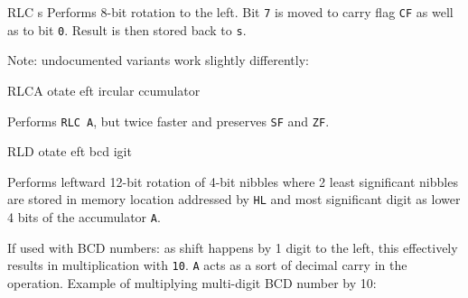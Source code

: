 \begin{basedescript}{
    \desclabelstyle{\multilinelabel}
    \desclabelwidth{3cm}}
\begin{DetailItem}{RLC s}
        Performs 8-bit rotation to the left. Bit {\tt 7} is moved to carry flag {\tt CF} as well as to bit {\tt 0}. Result is then stored back to {\tt s}.

        Note: undocumented variants work slightly differently:

        \begin{multicols}{2}

        \end{multicols}

        \begin{DetailEffects}[p]
            \FlagsRLCr
        \end{DetailEffects}
						
        \begin{DetailTiming}
        \end{DetailTiming}

    \end{DetailItem}

    \pagebreak
    \begin{DetailItem}{RLCA}
        {otate eft ircular ccumulator}
        {}
		
        Performs {\tt RLC A}, but twice faster and preserves {\tt SF} and {\tt ZF}.

        \begin{DetailEffects}
            \FlagsRLCA
        \end{DetailEffects}
						
        \begin{DetailTiming}
        \end{DetailTiming}

    \end{DetailItem}

    \label{DetailRefRLD}
    \begin{DetailItem}{RLD}
        {otate eft bcd igit}
        {\SymRLD}

        Performs leftward 12-bit rotation of 4-bit nibbles where 2 least significant nibbles are stored in memory location addressed by {\tt HL} and most significant digit as lower 4 bits of the accumulator {\tt A}.
		
        If used with BCD numbers: as shift happens by 1 digit to the left, this effectively results in multiplication with {\tt 10}. {\tt A} acts as a sort of decimal carry in the operation. Example of multiplying multi-digit BCD number by 10:


\end{DetailItem}
\end{basedescript}
